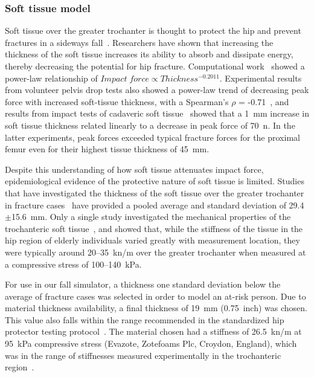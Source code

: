 		\subsubsection{Soft tissue model}
		\label{sec:fall_sim_design_methods_apparatus_soft}
		Soft tissue over the greater trochanter is thought to protect the hip and prevent fractures in a sideways fall~\citep{majumder_effects_2008, robinovitch_prediction_1991, robinovitch_force_1995}.
		Researchers have shown that increasing the thickness of the soft tissue increases its ability to absorb and dissipate energy, thereby decreasing the potential for hip fracture.
		Computational work~\citep{majumder_effects_2008} showed a power-law relationship of $ Impact \; force \propto Thickness^{-0.2011}$.
		Experimental results from volunteer pelvis drop tests also showed a power-law trend of decreasing peak force with increased soft-tissue thickness, with a Spearman's $\rho$ = -0.71~\citep{robinovitch_prediction_1991}, and results from impact tests of cadaveric soft tissue~\citep{robinovitch_force_1995} showed that a 1~\ac{mm} increase in soft tissue thickness related linearly to a decrease in peak force of 70~\ac{n}.
		In the latter experiments, peak forces exceeded typical fracture forces for the proximal femur even for their highest tissue thickness of 45~\ac{mm}.
		
		Despite this understanding of how soft tissue attenuates impact force, epidemiological evidence of the protective nature of soft tissue is limited.
		Studies that have investigated the thickness of the soft tissue over the greater trochanter in fracture cases~\citep{bouxsein_contribution_2007, nielson_trochanteric_2009, minns_are_2007} have provided a pooled average and standard deviation of 29.4$\pm$15.6~\ac{mm}.
		Only a single study investigated the mechanical properties of the trochanteric soft tissue~\citep{laing_force_2008}, and showed that, while the stiffness of the tissue in the hip region of elderly individuals varied greatly with measurement location, they were typically around 20--35~\ac{kn}/\ac{m} over the greater trochanter when measured at a compressive stress of 100--140~kPa.
		
		For use in our fall simulator, a thickness one standard deviation below the average of fracture cases was selected in order to model an at-risk person.
		Due to material thickness availability, a final thickness of 19~\ac{mm} (0.75~inch) was chosen.
		This value also falls within the range recommended in the standardized hip protector testing protocol~\citep{robinovitch_hip_2009}.
		The material chosen had a stiffness of 26.5~\ac{kn}/\ac{m} at 95~kPa compressive stress (Evazote, Zotefoams Plc, Croydon, England), which was in the range of stiffnesses measured experimentally in the trochanteric region~\citep{laing_force_2008}.


